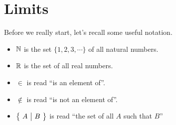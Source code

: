 \section{Limits}\label{sec limits}
Before we really start, let's recall some useful notation.
\begin{notn}\label{notn multivariable functions}
\begin{itemize}
\item 
$\mathbb{N}$ is the set $\{1,2,3,\cdots\}$ of all natural numbers.
\item
$\mathbb{R}$ is the set of all real numbers.
\item
$\in$ is read ``is an element of''.
\item
$\notin$ is read ``is not an element of''.
\item
$\big\{ \ A\ \big|\ B\ \big\}$ is read ``the set of all $A$ such that $B$''

\end{itemize}
\end{notn}

